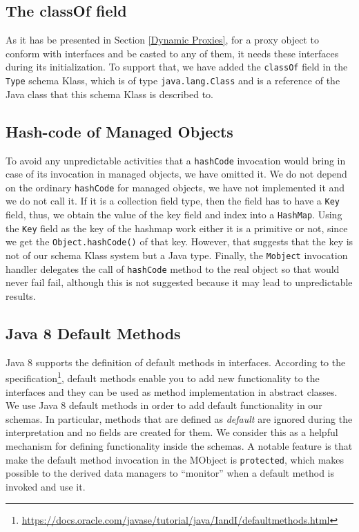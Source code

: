 \subsection{The classOf field}\label{The classOf field}
As it has be presented in Section \ref{Dynamic Proxies}, for a proxy object to conform with interfaces and be casted to any of them, it needs these interfaces during its initialization.
To support that, we have added the \texttt{classOf} field in the \texttt{Type} schema Klass, which is of type \texttt{java.lang.Class} and is a reference of the Java class that this schema Klass is described to.

\subsection{Hash-code of Managed Objects}\label{Hashcode of Managed Objects}
To avoid any unpredictable activities that a \texttt{hashCode} invocation would bring in case of its invocation in managed objects, we have omitted it. 
We do not depend on the ordinary \texttt{hashCode} for managed objects, we have not implemented it and we do not call it. 
If it is a collection field type, then the field has to have a \texttt{Key} field, thus, we obtain the value of the key field and index into a \texttt{HashMap}. 
Using the \texttt{Key} field as the key of the hashmap work either it is a primitive or not, since we get the \texttt{Object.hashCode()} of that key.
However, that suggests that the key is not of our schema Klass system but a Java type.
Finally, the \texttt{Mobject} invocation handler delegates the call of \texttt{hashCode} method to the real object so that would never fail fail, although this is not suggested because it may lead to unpredictable results.

\subsection{Java 8 Default Methods}\label{Java 8 Default Methods}
Java 8 supports the definition of default methods in interfaces.
According to the specification\footnote{\url{https://docs.oracle.com/javase/tutorial/java/IandI/defaultmethods.html}}, default methods enable you to add new functionality to the interfaces and they can be used as method implementation in abstract classes.
We use Java 8 default methods in order to add default functionality in our schemas. 
In particular, methods that are defined as \textit{default} are ignored during the interpretation and no fields are created for them.
We consider this as a helpful mechanism for defining functionality inside the schemas.
A notable feature is that make the default method invocation in the MObject is \texttt{protected}, which makes possible to the derived data managers to ``monitor'' when a default method is invoked and use it.

